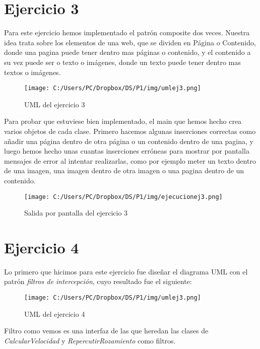 \documentclass{article}
\begin{document}
\section{Ejercicio 3}
Para este ejercicio hemos implementado el patrón composite dos veces. Nuestra idea trata sobre los elementos de una web, que se dividen en Página o Contenido, donde una pagina puede tener dentro mas páginas o contenido, y el contenido a su vez puede ser o texto o imágenes, donde un texto puede tener dentro mas textos o imágenes. 
\begin{figure}[H]
\centering
\texttt{[image: C:/Users/PC/Dropbox/DS/P1/img/umlej3.png]}
\caption{UML del ejercicio 3}
\end{figure}
Para probar que estuviese bien implementado, el main que hemos hecho crea varios objetos de cada clase. Primero hacemos al\textit{}gunas inserciones correctas como añadir una página dentro de otra página o un contenido dentro de una pagina, y luego hemos hecho unas cuantas inserciones erróneas para mostrar por pantalla mensajes de error al intentar realizarlas, como por ejemplo meter un texto dentro de una imagen, una imagen dentro de otra imagen o una pagina dentro de un contenido.
\begin{figure}[H]
\centering
\texttt{[image: C:/Users/PC/Dropbox/DS/P1/img/ejecucionej3.png]}
\caption{Salida por pantalla del ejercicio 3}
\end{figure}
\section{Ejercicio 4}
Lo primero que hicimos para este ejercicio fue diseñar el diagrama UML con el patrón \textit{filtros de intercepción}, cuyo resultado fue el siguiente:
\begin{figure}[H]
\centering
\texttt{[image: C:/Users/PC/Dropbox/DS/P1/img/umlej3.png]}
\caption{UML del ejercicio 4}
\end{figure}
Filtro como vemos es una interfaz de las que heredan las clases de \textit{CalcularVelocidad} y  \textit{RepercutirRozamiento} como filtros.
\end{document}
